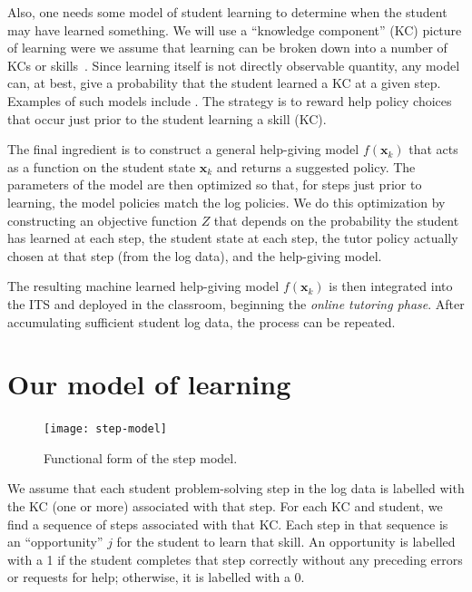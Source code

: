 \documentclass{edm_template}
\begin{document}
Also, one needs some model of student learning to determine when the
student may have learned something.  We will use a ``knowledge
component'' (KC) picture of learning were we assume that learning can be
broken down into a number of KCs or skills~\cite{vanlehn_behavior_2006}.  
Since learning itself is not directly observable quantity, any model
can, at best, give a probability that the student learned a KC at a
given step.  Examples of such models include
\cite{van_de_sande_measuring_2013,baker_detecting_2010}. 
The strategy is to reward help policy choices that occur just prior to
the student learning a skill (KC).

The final ingredient is to construct a general help-giving model $f(\mathbf{x}_k)$ that
acts as a function on the student state $\mathbf{x}_k$  and returns a suggested policy.
The parameters of the model are then optimized so that, for steps
just prior to learning, the model policies match the log policies.
We do this optimization by constructing an objective function $Z$ that
depends on the probability the student has learned at each step, the
student state at each step,  the tutor policy actually chosen at
that step (from the log data), and the help-giving model.

The resulting machine learned help-giving model $f(\mathbf{x}_k)$ is
then integrated into the  ITS and deployed in the classroom, beginning
the {\em online tutoring phase}.  After accumulating sufficient student log data,
the process can be repeated.


\section{Our model of learning}

\begin{figure}
\centering    \texttt{[image: step-model]}
  \caption{Functional form of the step model.}
         \label{stepf}
\end{figure}

We assume that each student problem-solving step in the log data is
labelled with the KC (one or more) associated with that step.  For
each KC and student, we find a sequence of steps associated with
that KC.  Each step in that sequence is an ``opportunity'' $j$ for the
student to learn that skill.  An opportunity is labelled with a 1
if the student completes that step correctly without any preceding
errors or requests for help; otherwise, it is labelled with a 0.
\end{document}
